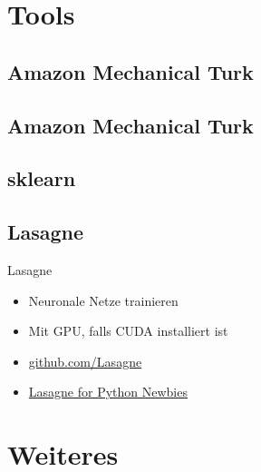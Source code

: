 \section{Tools}
\subsection{Amazon Mechanical Turk}

\subsection{Amazon Mechanical Turk}

\subsection{sklearn}

\subsection{Lasagne}
\begin{frame}{Lasagne}
    \begin{itemize}
        \item Neuronale Netze trainieren
        \item Mit GPU, falls CUDA installiert ist
        \item \href{https://github.com/Lasagne/Lasagne}{github.com/Lasagne}
        \item \href{http://martin-thoma.com/lasagne-for-python-newbies}{Lasagne for Python Newbies}
    \end{itemize}
\end{frame}


\section{Weiteres}
